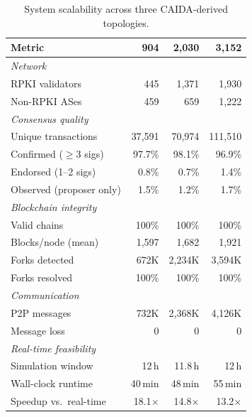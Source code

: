 \documentclass[conference]{IEEEtran}
\begin{document}
\begin{table}[t]
  \caption{System scalability across three CAIDA-derived topologies.}
  \label{tab:scalability}
  \begin{threeparttable}
    \footnotesize
    \setlength{\tabcolsep}{3pt}
    \begin{tabular*}{\columnwidth}{l @{\extracolsep{\fill}} rrr}
      \toprule
      \textbf{Metric} & \textbf{904} & \textbf{2{,}030} & \textbf{3{,}152} \\
      \midrule
      \textit{Network} \\
      \quad RPKI validators          & 445     & 1{,}371  & 1{,}930 \\
      \quad Non-RPKI ASes            & 459     & 659      & 1{,}222 \\
      \midrule
      \textit{Consensus quality} \\
      \quad Unique transactions       & 37{,}591 & 70{,}974 & 111{,}510 \\
      \quad Confirmed ($\geq$3 sigs) & 97.7\%  & 98.1\%   & 96.9\% \\
      \quad Endorsed (1--2 sigs)      & 0.8\%   & 0.7\%    & 1.4\% \\
      \quad Observed (proposer only)  & 1.5\%   & 1.2\%    & 1.7\% \\
      \midrule
      \textit{Blockchain integrity} \\
      \quad Valid chains              & 100\%   & 100\%    & 100\% \\
      \quad Blocks/node (mean)        & 1{,}597 & 1{,}682  & 1{,}921 \\
      \quad Forks detected            & 672K    & 2{,}234K & 3{,}594K \\
      \quad Forks resolved            & 100\%   & 100\%    & 100\% \\
      \midrule
      \textit{Communication} \\
      \quad P2P messages              & 732K    & 2{,}368K & 4{,}126K \\
      \quad Message loss              & 0       & 0        & 0 \\
      \midrule
      \textit{Real-time feasibility} \\
      \quad Simulation window          & 12\,h   & 11.8\,h  & 12\,h \\
      \quad Wall-clock runtime         & 40\,min & 48\,min  & 55\,min \\
      \quad Speedup vs.\ real-time     & 18.1$\times$ & 14.8$\times$ & 13.2$\times$ \\
      \bottomrule
    \end{tabular*}
  \end{threeparttable}
\end{table}
\end{document}
